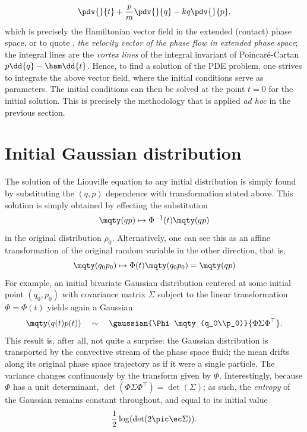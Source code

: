 $$ \pdv{}{t} + \frac{p}{m}\pdv{}{q} - kq\pdv{}{p}, $$
which is precisely the Hamiltonian vector field in the extended (contact) phase space, or to quote \citet[p. 237]{Arnold1989}, \emph{the velocity vector of the phase flow in extended phase space}; the integral lines are the \emph{vortex lines} of the integral invariant of Poincaré-Cartan $p\dd{q} - \ham\dd{t}$. Hence, to find a solution of the PDE problem, one strives to integrate the above vector field, where the initial conditions serve as parameters. The initial conditions can then be solved at the point $t=0$ for the initial solution. This is precisely the methodology that is applied \emph{ad hoc} in the previous section.

\section{Initial Gaussian distribution} 
The solution of the Liouville equation to any initial distribution is simply found by substituting the $(q,p)$ dependence with transformation stated above. This solution is simply obtained by effecting the substitution 
$$\mqty(q\\p) \mapsto \Phi^{-1}(t)\mqty(q\\p)$$
in the original distribution $\rho_0$. Alternatively, one can see this as an affine transformation of the original random variable in the other direction, that is, 
$$\mqty(q_0\\p_0) \mapsto \Phi(t)\mqty(q_0\\p_0) = \mqty(q\\p)$$
For example, an initial bivariate Gaussian distribution centered at some initial point $(q_0, p_0)$ with covariance matrix $\Sigma$ subject to the linear transformation $\Phi = \Phi(t)$ yields again a Gaussian: \cite{Schon2011}
\begin{equation}
    \mqty(q(t)\\p(t)) \quad \sim \quad \gaussian{\Phi\mqty(q_0\\p_0)}{\Phi\Sigma\Phi^\top}.
    \label{eq:ho_gaussian}
\end{equation}
This result is, after all, not quite a surprise: the Gaussian distribution is transported by the convective stream of the phase space fluid; the mean drifts along its original phase space trajectory as if it were a single particle. The variance changes continuously by the transform given by $\Phi$. Interestingly, because $\Phi$ has a unit determinant, $\det(\Phi\Sigma\Phi^\top) = \det(\Sigma)$; as such, the \emph{entropy} of the Gaussian remains constant throughout, and equal to its initial value
$$ \frac{1}{2}\log(\det(2\pic\ec\Sigma)). $$

